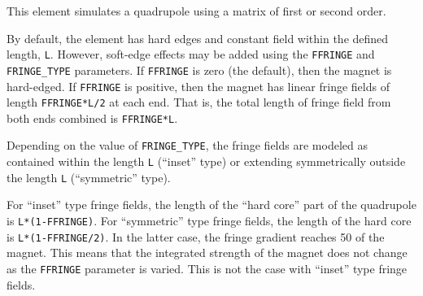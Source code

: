 This element simulates a quadrupole using a matrix of first or second order.

By default, the element has hard edges and constant field within the defined
length, {\tt L}.  However, soft-edge effects may be added using the {\tt FFRINGE} and
{\tt FRINGE\_TYPE} parameters.  If {\tt FFRINGE} is zero (the default), then
the magnet is hard-edged.  If {\tt FFRINGE} is positive, then the magnet 
has linear fringe fields of length {\tt FFRINGE*L/2} at each end.  That is,
the total length of fringe field from both ends combined is {\tt FFRINGE*L}.

Depending on the value of {\tt FRINGE\_TYPE}, the fringe fields are
modeled as contained within the length {\tt L} (``inset'' type) or
extending symmetrically outside the length {\tt L} (``symmetric''
type).

For ``inset'' type fringe fields, the length of the ``hard core'' part of
the quadrupole is {\tt L*(1-FFRINGE)}.  For ``symmetric'' type fringe fields,
the length of the hard core is {\tt L*(1-FFRINGE/2)}.  In the latter case,
the fringe gradient reaches 50%
of the magnet. This means that the integrated strength of the magnet does not
change as the {\tt FFRINGE} parameter is varied. This is not the case with
``inset'' type fringe fields.

